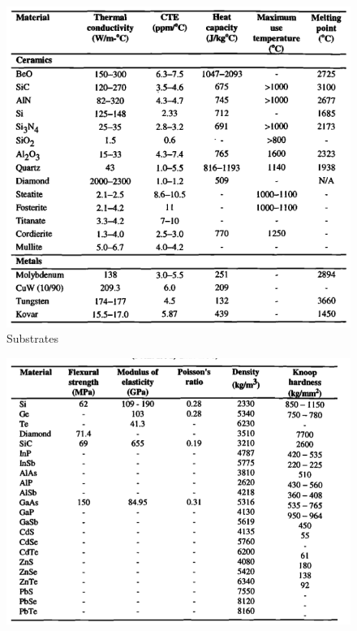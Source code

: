\documentclass[final]{cubedoc}
\begin{document}
\begin{figure}[h!]
    \centering
    \includegraphics[keepaspectratio, width=\textwidth]{docs/substrates.png}
    \caption{Substrates \cite[p.32]{pecht1998electronic}}
    \label{fig:my_label}
\end{figure}

\begin{figure}[h!]
    \centering
    \includegraphics[keepaspectratio, width=\textwidth]{docs/density_table.png}
    \caption{\cite[p.24]{pecht1998electronic}}
    \label{fig:my_label}
\end{figure}
\end{document}

